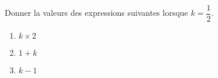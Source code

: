 
\begin{exercice}\label{exo2smath-0162}

    Donner la valeurs des expressions suivantes lorsque \( k=\dfrac{ 1 }{2}\).
    \begin{multicols}{2}
    \begin{enumerate}
        \item
            \( k\times 2\)
        \item
            \( 1+k\)
        \item
            \( k-1\)
    \end{enumerate}
    \end{multicols}

\end{exercice}
